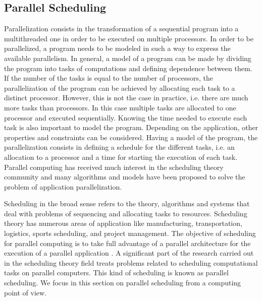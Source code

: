 \subsection{Parallel Scheduling}

Parallelization consists in the transformation of a sequential program into a multithreaded one in order to be executed on multiple processors. In order to be parallelized, a program needs to be modeled in such a way to express the available parallelism. In general, a model of a program can be made by dividing the program into tasks of computations and defining dependence between them. 
If the number of the tasks is equal to the number of processors, the parallelization of the program can be achieved by allocating each task to a distinct processor. However, this is not the case in practice, i.e. there are much more tasks than processors. In this case multiple tasks are allocated to one processor and executed sequentially.  
Knowing the time needed to execute each task is also important to model the program. Depending on the application, other properties and constraints can be considered. Having a model of the program, the parallelization consists in defining a schedule for the different tasks, i.e. an allocation to a processor and a time for starting the execution of each task. Parallel computing has received much interest in the scheduling theory community and many algorithms and models have been proposed to solve the problem of application parallelization.   

Scheduling in the broad sense refers to the theory, algorithms and systems that deal with problems of sequencing and allocating tasks to resources. Scheduling theory has numerous areas of application like manufacturing, transportation, logistics, sports scheduling, and project management. The objective of scheduling for parallel computing is to take full advantage of a parallel architecture for the execution of a parallel application . A significant part of the research carried out in the scheduling theory field treats problems related to scheduling computational tasks on parallel computers. This kind of scheduling is known as parallel scheduling. We focus in this section on parallel scheduling from a computing point of view.

